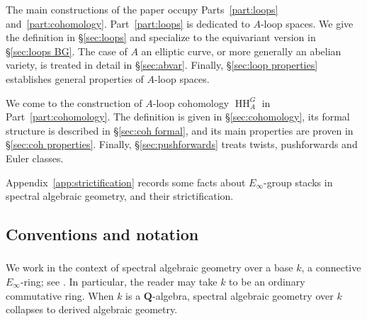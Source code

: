 \documentclass[12pt, oneside]{amsart}
\numberwithin{equation}{section}
\theoremstyle{remark}
\theoremstyle{plain}
\newcommand{\HH}{\operatorname{HH}}
\begin{document}
The main constructions of the paper occupy Parts~\ref{part:loops} and~\ref{part:cohomology}.
Part~\ref{part:loops} is dedicated to $A$-loop spaces.
We give the definition in \S \ref{sec:loops} and specialize to the equivariant version in \S \ref{sec:loops BG}.
The case of $A$ an elliptic curve, or more generally an abelian variety, is treated in detail in \S \ref{sec:abvar}.
Finally, \S \ref{sec:loop properties} establishes general properties of $A$-loop spaces.

We come to the construction of $A$-loop cohomology $\HH_A^G$ in Part~\ref{part:cohomology}.
The definition is given in \S \ref{sec:cohomology}, its formal structure is described in \S \ref{sec:coh formal}, and its main properties are proven in \S \ref{sec:coh properties}.
Finally, \S \ref{sec:pushforwards} treats twists, pushforwards and Euler classes.

Appendix~\ref{app:strictification} records some facts about $E_\infty$-group stacks in spectral algebraic geometry, and their strictification.

\subsection{Conventions and notation}\label{ssec:intro/conv}

\subsubsection{}\label{sssec:intro/conv/base}

We work in the context of spectral algebraic geometry over a base $k$, a connective $E_\infty$-ring; see \cite{SAG}.
In particular, the reader may take $k$ to be an ordinary commutative ring.
When $k$ is a $\mathbf{Q}$-algebra, spectral algebraic geometry over $k$ collapses to derived algebraic geometry.
\end{document}
